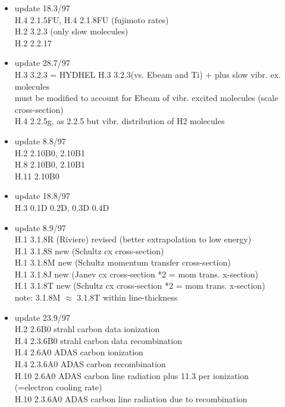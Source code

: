 \documentclass[12pt,dvips]{article}
\begin{document}
\begin{itemize}
   Corona H-ionization rate from SOLXY: out, because:
   wrong, and never used anyway
(i.e. H.8 2.1.5G out).
 \item update   18.3/97 \\
  H.4 2.1.5FU, H.4 2.1.8FU (fujimoto rates) \\
  H.2 3.2.3  (only slow molecules) \\
  H.2 2.2.17
 \item update   28.7/97 \\
  H.3 3.2.3  = HYDHEL H.3 3.2.3(vs. Ebeam and Ti) + plus
  slow vibr. ex. molecules\\
  must be modified to account for Ebeam of vibr. excited
  molecules (scale cross-section)\\
  H.4 2.2.5g, as 2.2.5 but vibr. distribution of H2 molecules
 \item update    8.8/97 \\
  H.2 2.10B0, 2.10B1 \\
  H.8 2.10B0, 2.10B1 \\
  H.11 2.10B0
 \item update   18.8/97 \\
  H.3 0.1D  0.2D, 0.3D 0.4D \\
 \item update    8.9/97 \\
  H.1 3.1.8R (Riviere) revised (better extrapolation to low energy) \\
  H.1 3.1.8S new (Schultz cx cross-section) \\
  H.1 3.1.8M new (Schultz momentum transfer cross-section) \\
  H.1 3.1.8J new (Janev cx cross-section *2 = mom trans. x-section)\\
  H.1 3.1.8T new (Schultz cx cross-section *2 = mom trans. x-section)\\
  note: 3.1.8M $\approx$ 3.1.8T within line-thickness
 \item update   23.9/97 \\
  H.2 2.6B0 strahl carbon data ionization\\
  H.4 2.3.6B0 strahl carbon data recombination \\
  H.4 2.6A0 ADAS  carbon ionization    \\
  H.4 2.3.6A0 ADAS  carbon recombination \\
  H.10 2.6A0 ADAS  carbon line radiation plus 11.3 per ionization\\
                   (=electron cooling rate)\\
  H.10 2.3.6A0 ADAS  carbon line radiation due to recombination\\

\end{itemize}
\end{document}
